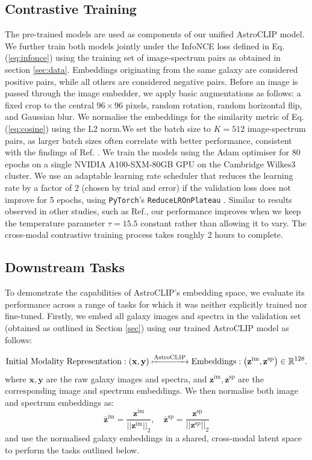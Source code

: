 \documentclass[a4paper,12pt]{article}
\begin{document}
\subsection{Contrastive Training}
\label{sec:training}
The pre-trained models are used as components of our unified AstroCLIP model. We further train both models jointly under the InfoNCE loss defined in Eq. (\ref{eq:infonce}) using the training set of image-spectrum pairs as obtained in section \ref{sec:data}. Embeddings originating from the same galaxy are considered positive pairs, while all others are considered negative pairs. Before an image is passed through the image embedder, we apply basic augmentations as follows: a fixed crop to the central $96 \times 96$ pixels, random rotation, random horizontal flip, and Gaussian blur. We normalise the embeddings for the similarity metric of Eq. (\ref{eq:cosine}) using the L2 norm.We set the batch size to $K=512$ image-spectrum pairs, as larger batch sizes often correlate with better performance, consistent with the findings of Ref. \cite{radford2021learning}. We train the models using the Adam optimiser \cite{adam} for 80 epochs on a single NVIDIA A100-SXM-80GB GPU on the Cambridge Wilkes3 cluster. We use an adaptable learning rate scheduler that reduces the learning rate by a factor of 2 (chosen by trial and error) if the validation loss does not improve for 5 epochs, using \verb|PyTorch|'s \verb|ReduceLROnPlateau| \cite{LRon}. Similar to results observed in other studies, such as Ref.\cite{gir}, our performance improves when we keep the temperature parameter $\tau = 15.5$ constant rather than allowing it to vary. The cross-modal contrastive training process takes roughly 2 hours to complete.

\subsection{Downstream Tasks}
\label{sec:downstream_tasks}
To demonstrate the capabilities of AstroCLIP's embedding space, we evaluate its performance across a range of tasks for which it was neither explicitly trained nor fine-tuned. Firstly, we embed all galaxy images and spectra in the validation set (obtained as outlined in Section \ref{sec}) using our trained AstroCLIP model as follows:

\begin{equation}
    \text{Initial Modality Representation} : \left( \mathbf{x}, \mathbf{y} \right) \xmapsto{\text{AstroCLIP}} \text{Embeddings} : \left( \mathbf{z}^{\text{im}}, \mathbf{z}^{\text{sp}} \right) \in \mathbb{R}^{128}.
\end{equation}
where $\mathbf{x}, \mathbf{y}$ are the raw galaxy images and spectra, and $\mathbf{z}^{\text{im}}, \mathbf{z}^{\text{sp}}$ are the corresponding image and spectrum embeddings. We then normalise both image and spectrum embeddings as:
\begin{equation}
    \mathbf{\bar{z}}^{\text{im}} =  \frac{\mathbf{z}^{\text{im}} }{|| \mathbf{z}^{\text{im}} ||_2}, \quad \mathbf{\bar{z}}^{\text{sp}} =  \frac{\mathbf{z}^{\text{sp}} }{|| \mathbf{z}^{\text{sp}} ||_2}
\end{equation}
and use the normalised galaxy embeddings in a shared, cross-modal latent space to perform the tasks outlined below.
\end{document}
